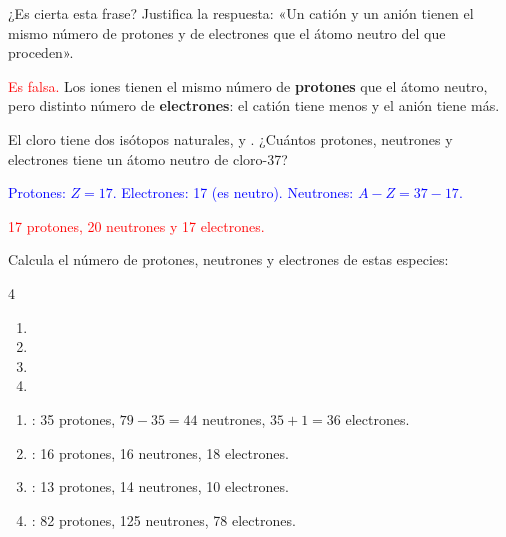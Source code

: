\begin{exercise}
    ¿Es cierta esta frase? Justifica la respuesta: «Un catión y un anión tienen el mismo número de protones y de electrones que el átomo neutro del que proceden».
    \begin{solu}
        \textcolor{red}{Es falsa.} Los iones tienen el mismo número de \textbf{protones} que el átomo neutro, pero distinto número de \textbf{electrones}: el catión tiene menos y el anión tiene más.
    \end{solu}
\end{exercise}

\begin{exercise}
    El cloro tiene dos isótopos naturales,  y . ¿Cuántos protones, neutrones y electrones tiene un átomo neutro de cloro-37?
    \begin{solu}
        \textcolor{blue}{Protones: \(Z = 17\). Electrones: 17 (es neutro). Neutrones: \(A - Z = 37 - 17\).}

        \textcolor{red}{17 protones, 20 neutrones y 17 electrones.}
    \end{solu}
\end{exercise}

\begin{exercise}
    Calcula el número de protones, neutrones y electrones de estas especies:
    \begin{multicols}{4}
        \begin{enumerate}[label=\alph*)]
            \item {}
            \item {}
            \item {}
            \item {}
        \end{enumerate}
    \end{multicols}
    \begin{solu}
        \begin{enumerate}[label=\alph*)]
            \item {}: 35 protones, \(79 - 35 = 44\) neutrones, \(35 + 1 = 36\) electrones.
            \item {}: 16 protones, 16 neutrones, 18 electrones.
            \item {}: 13 protones, 14 neutrones, 10 electrones.
            \item {}: 82 protones, 125 neutrones, 78 electrones.
        \end{enumerate}
    \end{solu}
\end{exercise}

